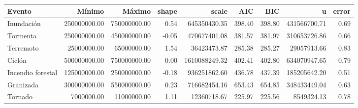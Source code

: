 \begin{table}[ht]
\centering
\begin{tabular}{lrrrrrrrr}
  \hline
Evento & Mínimo & Máximo & shape & scale & AIC & BIC & u & error \\ 
  \hline
Inundación & 250000000.00 & 750000000.00 & 0.54 & 645350430.35 & 398.40 & 398.80 & 431566700.71 & 0.69 \\ 
  Tormenta & 250000000.00 & 450000000.00 & -0.05 & 470677401.08 & 381.57 & 381.97 & 310653726.86 & 0.66 \\ 
  Terremoto & 25000000.00 & 65000000.00 & 1.54 & 36423473.87 & 285.38 & 285.27 & 29057913.66 & 0.83 \\ 
  Ciclón & 500000000.00 & 750000000.00 & 0.00 & 1610088249.32 & 402.41 & 402.80 & 634070947.65 & 0.79 \\ 
  Incendio forestal & 125000000.00 & 250000000.00 & -0.18 & 936251862.60 & 436.78 & 437.39 & 185205642.20 & 0.51 \\ 
  Granizada & 300000000.00 & 550000000.00 & 0.23 & 716682454.16 & 653.43 & 654.85 & 348433449.04 & 0.63 \\ 
  Tornado & 7000000.00 & 11000000.00 & 1.11 & 12360718.67 & 225.97 & 225.56 & 8549324.13 & 0.78 \\ 
   \hline
\end{tabular}
\end{table}
